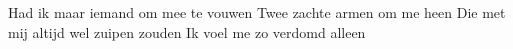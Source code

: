 
\begin{verse*}
Had ik maar iemand om mee te vouwen
Twee zachte armen om me heen
Die met mij altijd wel zuipen zouden
Ik voel me zo verdomd alleen
\end{verse*}
